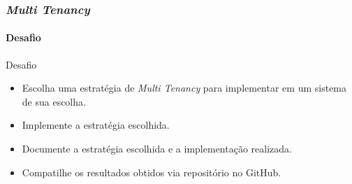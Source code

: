 \documentclass[
	9pt, %
	t, %
]{beamer}
\begin{document}
\begin{frame}
	\frametitle{\textit{Multi Tenancy}}
	\framesubtitle{Desafio}


	\begin{block}{Desafio}
		\begin{itemize}
			\item Escolha uma estratégia de \textit{Multi Tenancy} para implementar em um sistema de sua escolha.
			\item Implemente a estratégia escolhida.
			\item Documente a estratégia escolhida e a implementação realizada.
			\item Compatilhe os resultados obtidos via repositório no GitHub.
		\end{itemize}
	\end{block}

\end{frame}
\end{document}
